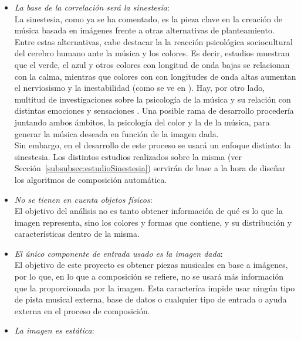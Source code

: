		\begin{itemize}
		
		\item \emph{La base de la correlación será la sinestesia}:
			\vspace{0.1in}
			\\La sinestesia, como ya se ha comentado, es la pieza clave en la creación de música basada en imágenes frente a otras alternativas de planteamiento.\\
			Entre estas alternativas, cabe destacar la la reacción psicológica sociocultural del cerebro humano ante la música y los colores. Es decir, estudios muestran que el verde, el azul y otros colores con longitud de onda bajas se relacionan con la calma, mientras que colores con con longitudes de onda altas aumentan el nerviosismo y la inestabilidad (como se ve en \cite{colorpsy}). Hay, por otro lado, multitud de investigaciones sobre la psicología de la música y su relación con distintas emociones y sensaciones . Una posible rama de desarrollo procedería juntando ambos ámbitos, la psicología del color y la de la música, para generar la música deseada en función de la imagen dada.\\
			Sin embargo, en el desarrollo de este proceso se usará un enfoque distinto: la sinestesia. Los distintos estudios realizados sobre la misma (ver Sección~\ref{subsubsec:estudioSinestesia}) servirán de base a la hora de diseñar los algoritmos de composición automática.
		\item \emph{No se tienen en cuenta objetos físicos}:
			\vspace{0.1in}
			\\El objetivo del análisis no es tanto obtener información de qué es lo que la imagen representa, sino los colores y formas que contiene, y su distribución y características dentro de la misma.
		\item \emph{El único componente de entrada usado es la imagen dada}:
			\vspace{0.1in}
			\\El objetivo de este proyecto es obtener piezas musicales en base a imágenes, por lo que, en lo que a composición se refiere, no se usará más información que la proporcionada por la imagen. Esta caracteríca impide usar ningún tipo de pista musical externa, base de datos o cualquier tipo de entrada o ayuda externa en el proceso de composición.
		\item \emph{La imagen es estática}:
			\vspace{0.1in}

\end{itemize}
